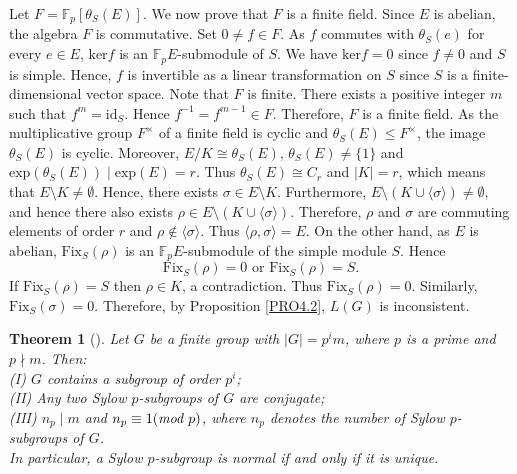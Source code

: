 \documentclass[12pt]{article}
\newtheorem{theorem}{\bf Theorem}[section]
\def\QEDopen{{\setlength{\fboxsep}{0pt}\setlength{\fboxrule}{0.2pt}\fbox{\rule[0pt]{0pt}{1.3ex}\rule[0pt]{1.3ex}{0pt}}}}
\def\QED{\QEDopen}
\def\endproof{\hspace*{\fill}~\QED\par\endtrivlist\unskip}
\begin{document}
Let $F=\mathbb{F}_p[\theta_S(E)]$. We now prove that $F$ is a finite field. 
Since $E$ is abelian, the algebra $F$ is commutative. Set $0\neq f\in F$. As 
$f$ commutes with $\theta_S(e)$ for every $e\in E$, $\mbox{ker}f$ is an $\mathbb{F}_pE$-submodule of $S$.
We have $\mbox{ker}f=0$ since $f\neq 0$ and $S$ is simple. Hence, $f$ is invertible as a linear 
transformation on $S$ since $S$ is a finite-dimensional vector space. 
Note that $F$ is finite. There exists a positive integer $m$ such that $f^m=\mbox{id}_S$. Hence $f^{-1}=f^{m-1}\in F$.
Therefore, $F$ is a finite field. As the multiplicative group $F^{\times}$ of a finite field is cyclic and $\theta_S(E)\leq F^{\times}$, 
the image $\theta_S(E)$ is cyclic. 
Moreover, $E/K\cong \theta_S(E)$, $\theta_S(E)\neq \{1\}$ and 
$\mbox{exp}(\theta_S(E))\mid \mbox{exp}(E)=r$. 
Thus $\theta_S(E)\cong C_r$ and $|K|=r$, which means that 
$E\setminus K \neq \emptyset$. Hence, there exists $\sigma\in E\setminus K$.
Furthermore,  $E\setminus (K\cup \langle \sigma \rangle) \neq \emptyset$, and hence there also exists $\rho \in E\setminus (K\cup \langle \sigma \rangle)$.
Therefore, $\rho$ and $\sigma$ are commuting elements of order $r$ and
$\rho\notin\langle\sigma\rangle$. Thus $\langle\rho,\sigma\rangle=E$. On the other hand, as $E$ is abelian, $\mbox{Fix}_S(\rho)$ is an $\mathbb{F}_pE$-submodule of the simple module $S$. 
Hence $$\mbox{Fix}_{S}(\rho)= 0 \mbox{ or } \mbox{Fix}_{S}(\rho)=S.$$
If $\mbox{Fix}_{S}(\rho)=S$ then $\rho\in K$, a contradiction. 
Thus $\mbox{Fix}_{S}(\rho)= 0$. Similarly, $\mbox{Fix}_{S}(\sigma)=0$.
Therefore, by Proposition \ref{PRO4.2},  $L(G)$ is inconsistent. 
\endproof

\begin{theorem}[\cite{Rotman}]\label{Sylow}
Let $G$ be a finite group with $|G|=p^{i}m$, where $p$ is a prime and $p\nmid m$. Then: \\
(I) $G$ contains a subgroup of order $p^{i}$;\\
(II) Any two Sylow $p$-subgroups of $G$ are conjugate; \\
(III) $n_p\mid m$ and $n_p\equiv 1 (\emph{mod } p)$, where $n_p$ denotes the number of Sylow $p$-subgroups of $G$.\\
In particular, a Sylow $p$-subgroup is normal if and only if it is unique.
\end{theorem}
\end{document}
